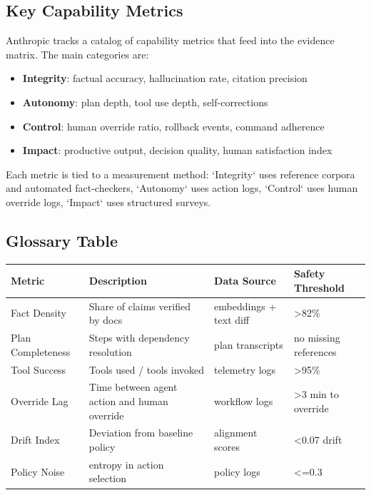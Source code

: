 \documentclass[a4paper]{article}
\begin{document}
\subsection{Key Capability Metrics}

Anthropic tracks a catalog of capability metrics that feed into the evidence matrix. The main categories are:

\begin{itemize}
    \item \textbf{Integrity}: factual accuracy, hallucination rate, citation precision
    \item \textbf{Autonomy}: plan depth, tool use depth, self-corrections
    \item \textbf{Control}: human override ratio, rollback events, command adherence
    \item \textbf{Impact}: productive output, decision quality, human satisfaction index
\end{itemize}

Each metric is tied to a measurement method: `Integrity` uses reference corpora and automated fact-checkers, `Autonomy` uses action logs, `Control` uses human override logs, `Impact` uses structured surveys.

\subsection{Glossary Table}

\begin{tabular}{p{}p{}p{}p{}}
\toprule
Metric & Description & Data Source & Safety Threshold \\
\midrule
Fact Density & Share of claims verified by docs & embeddings + text diff & >82\% \\
Plan Completeness & Steps with dependency resolution & plan transcripts & no missing references \\
Tool Success & Tools used / tools invoked & telemetry logs & >95\% \\
Override Lag & Time between agent action and human override & workflow logs & >3 min to override \\
Drift Index & Deviation from baseline policy & alignment scores & <0.07 drift \\
Policy Noise & entropy in action selection & policy logs & <=0.3 \\
\bottomrule
\end{tabular}
\end{document}
